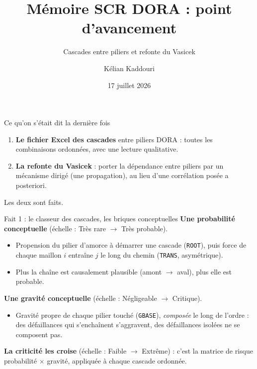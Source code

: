 \documentclass[11pt]{beamer}
\title[Point d'avancement]{Mémoire SCR DORA : point d'avancement}
\subtitle{Cascades entre piliers et refonte du Vasicek}
\author[K. Kaddouri]{Kélian Kaddouri}
\institute[ENSAE / Nexialog]{ENSAE / Nexialog Consulting}
\date[17/07/2026]{17 juillet 2026}
\begin{document}
\begin{frame}
\titlepage
\end{frame}

\begin{frame}{Ce qu'on s'était dit la dernière fois}
\begin{enumerate}
\item \textbf{Le fichier Excel des cascades} entre piliers DORA :
      toutes les combinaisons ordonnées, avec une lecture qualitative.
\item \textbf{La refonte du Vasicek} : porter la dépendance entre piliers par un
      mécanisme dirigé (une propagation), au lieu d'une corrélation posée a posteriori.
\end{enumerate}
\vfill
Les deux sont faits.
\end{frame}

\begin{frame}{Fait 1 : le classeur des cascades, les briques conceptuelles}
\textbf{Une probabilité conceptuelle} (échelle : Très rare $\to$ Très probable).
\begin{itemize}
\item Propension du pilier d'amorce à démarrer une cascade (\texttt{ROOT}),
      puis force de chaque maillon \og $i$ entraîne $j$ \fg{} le long du chemin
      (\texttt{TRANS}, asymétrique).
\item Plus la chaîne est causalement plausible (amont $\to$ aval), plus elle est probable.
\end{itemize}
\medskip
\textbf{Une gravité conceptuelle} (échelle : Négligeable $\to$ Critique).
\begin{itemize}
\item Gravité propre de chaque pilier touché (\texttt{GBASE}), \emph{composée} le long
      de l'ordre : des défaillances qui s'enchaînent s'aggravent, des défaillances
      isolées ne se composent pas.
\end{itemize}
\medskip
\textbf{La criticité les croise} (échelle : Faible $\to$ Extrême) : c'est la matrice de
risque probabilité $\times$ gravité, appliquée à chaque cascade ordonnée.
\end{frame}
\end{document}
